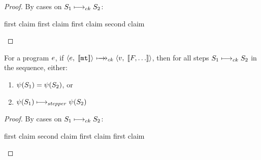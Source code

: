 \documentclass{article}
\begin{document}
\begin{proof}
By cases on $S_1 \longmapsto_{ck} S_2$:
\begin{byCases}
  first claim
  first claim
  first claim
  \case{\betaneednr}
  second claim
\end{byCases}
\end{proof}




\begin{theorem}
For a program $e$, if $\ck{\e}{\mtFss} \cksteps \ck{\val}{\Fss}$, then for all
steps $S_1 \longmapsto_{ck} S_2$ in the sequence, either:
\begin{enumerate}
  \item $\psi(S_1) = \psi(S_2)$, or
  \item $\psi(S_1) \longmapsto_{stepper} \psi(S_2)$
\end{enumerate}
\end{theorem}

\begin{proof}
By cases on $S_1 \longmapsto_{ck} S_2$:
\begin{byCases}
  first claim
  second claim
  first claim
  \case{\betaneednr}
  first claim
\end{byCases}
\end{proof}
\end{document}
